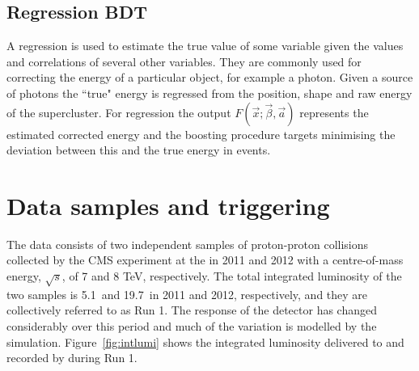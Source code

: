 \subsection{Regression \acs{BDT}}
A regression \BDT is used to estimate the true value of some variable given the values and correlations of several other variables. They are commonly used for correcting the energy of a particular object, for example a photon. Given a \MC source of photons the ``true" energy is regressed from the position, shape and raw energy of the supercluster. For regression \BDTs the output $F(\vec{x};\vec{\beta},\vec{a})$ represents the estimated corrected energy and the boosting procedure targets minimising the deviation between this and the true energy in \MC events. 

\section{Data samples and triggering}

The data consists of two independent samples of proton-proton collisions collected by the CMS experiment at the \LHC in 2011 and 2012 with a centre-of-mass energy, $\sqrt{s}$, of 7 and 8 TeV, respectively. The total integrated luminosity of the two samples is 5.1~\fb and 19.7~\fb in 2011 and 2012, respectively, and they are collectively referred to as \LHC Run 1. The response of the detector has changed considerably over this period and much of the variation is modelled by the \MC simulation. Figure~\ref{fig:intlumi} shows the integrated luminosity delivered to and recorded by \CMS during \LHC Run 1.

